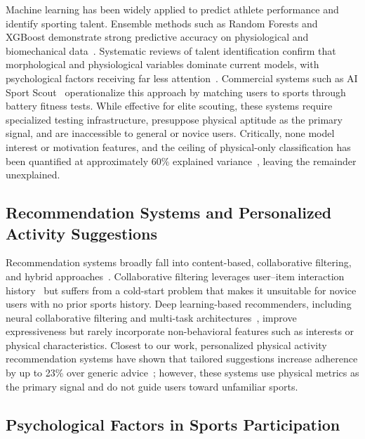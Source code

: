\documentclass[conference]{IEEEtran}
\begin{document}
Machine learning has been widely applied to predict athlete performance and
identify sporting talent.
Ensemble methods such as Random Forests and XGBoost demonstrate strong
predictive accuracy on physiological and biomechanical
data~\cite{nature2025sports, bunker2019framework}.
Systematic reviews of talent identification confirm that morphological and
physiological variables dominate current models, with psychological factors
receiving far less attention~\cite{ramos2022talent}.
Commercial systems such as AI Sport Scout~\cite{aisportscout2024}
operationalize this approach by matching users to sports through battery
fitness tests.
While effective for elite scouting, these systems require specialized testing
infrastructure, presuppose physical aptitude as the primary signal, and are
inaccessible to general or novice users.
Critically, none model interest or motivation features, and the ceiling of
physical-only classification has been quantified at approximately 60\%
explained variance~\cite{lidor2005talent}, leaving the remainder unexplained.

\subsection{Recommendation Systems and Personalized Activity Suggestions}

Recommendation systems broadly fall into content-based, collaborative
filtering, and hybrid approaches~\cite{burke2002hybrid}.
Collaborative filtering leverages user--item interaction history~\cite{scitepress2017sports}
but suffers from a cold-start problem that makes it unsuitable for novice
users with no prior sports history.
Deep learning-based recommenders, including neural collaborative filtering
and multi-task architectures~\cite{zhang2019deep}, improve expressiveness
but rarely incorporate non-behavioral features such as interests or physical
characteristics.
Closest to our work, personalized physical activity recommendation systems
have shown that tailored suggestions increase adherence by up to 23\% over
generic advice~\cite{opast2023personalized}; however, these systems use
physical metrics as the primary signal and do not guide users toward
unfamiliar sports.

\subsection{Psychological Factors in Sports Participation}
\end{document}

